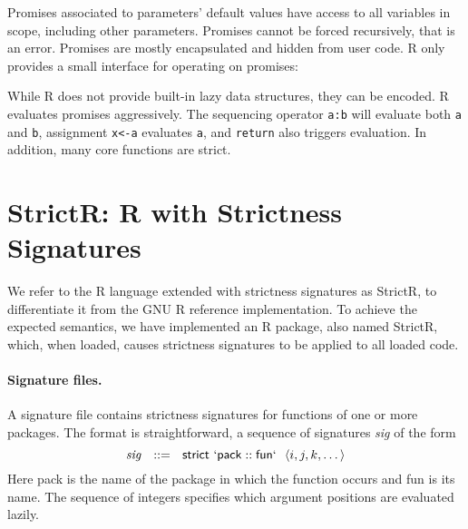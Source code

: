 \documentclass[review,nonacm,screen,acmsmall,anonymous=true]{acmart}
\newcommand{\code}[1]{\lstinline |#1|\xspace}
\newcommand{\strictr}{{\sf StrictR}\xspace}
\begin{document}
\noindent
Promises associated to parameters' default values have access to all variables
in scope, including other parameters. Promises cannot be forced recursively,
that is an error. Promises are mostly encapsulated and hidden from user code. R
only provides a small interface for operating on promises:

\noindent
While R does not provide built-in lazy data structures, they can be encoded. R
evaluates promises aggressively. The sequencing operator \code{a:b} will
evaluate both \code a and \code b, assignment \code{x<-a} evaluates \code a, and
\code{return} also triggers evaluation. In addition, many core functions are
strict.

\section{StrictR: R with Strictness Signatures}\label{sec:strictr}

We refer to the R language extended with strictness signatures as \strictr, to
differentiate it from the GNU R reference implementation. To achieve the
expected semantics, we have implemented an R package, also named \strictr,
which, when loaded, causes strictness signatures to be applied to all loaded
code.

\paragraph{Signature files.}
A signature file contains strictness signatures for functions of one or more
packages. The format is straightforward, a sequence of signatures \emph{sig} of
the form
%
\[
\mathit{sig}~~::=~~\mathsf{strict}~\mathsf{`pack}::\mathsf{fun`}~~\langle i, j, k, \dots\rangle
\]
%
Here {\sf pack} is the name of the package in which the function occurs and {\sf
  fun} is its name. The sequence of integers specifies which argument positions
are evaluated lazily.
\end{document}
